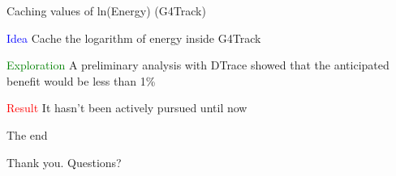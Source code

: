 \documentclass{beamer}
\begin{document}
\begin{frame}{Caching values of ln(Energy) (G4Track)}

\textcolor{blue}{Idea} Cache the logarithm of energy inside G4Track

\vspace{5mm}

\textcolor{green}{Exploration} A preliminary analysis with DTrace showed that the anticipated benefit would be less than 1\%

\vspace{5mm}

\textcolor{red}{Result} It hasn't been actively pursued until now
\end{frame}

\begin{frame}{The end}
\vspace*{\fill}
\begin{center}
Thank you. Questions?
\end{center}
\vspace*{\fill}
\end{frame}
\end{document}
